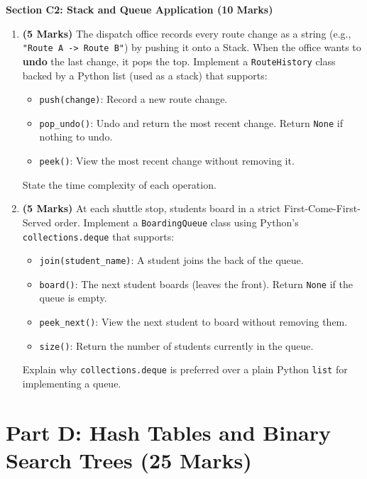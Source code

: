 \documentclass[11pt,a4paper]{article}
\begin{document}
\vspace{0.5cm}
\textbf{Section C2: Stack and Queue Application (10 Marks)}

\begin{enumerate}[label=\textbf{C\arabic*.}, resume]
    \item \textbf{(5 Marks)} The dispatch office records every route change as a string (e.g., \texttt{"Route A -> Route B"}) by pushing it onto a Stack. When the office wants to \textbf{undo} the last change, it pops the top. Implement a \texttt{RouteHistory} class backed by a Python list (used as a stack) that supports:
    \begin{itemize}
        \item \texttt{push(change)}: Record a new route change.
        \item \texttt{pop\_undo()}: Undo and return the most recent change. Return \texttt{None} if nothing to undo.
        \item \texttt{peek()}: View the most recent change without removing it.
    \end{itemize}
    State the time complexity of each operation.

    \item \textbf{(5 Marks)} At each shuttle stop, students board in a strict First-Come-First-Served order. Implement a \texttt{BoardingQueue} class using Python's \texttt{collections.deque} that supports:
    \begin{itemize}
        \item \texttt{join(student\_name)}: A student joins the back of the queue.
        \item \texttt{board()}: The next student boards (leaves the front). Return \texttt{None} if the queue is empty.
        \item \texttt{peek\_next()}: View the next student to board without removing them.
        \item \texttt{size()}: Return the number of students currently in the queue.
    \end{itemize}
    Explain why \texttt{collections.deque} is preferred over a plain Python \texttt{list} for implementing a queue.
\end{enumerate}

\newpage

\section{Part D: Hash Tables and Binary Search Trees (25 Marks)}
\end{document}
